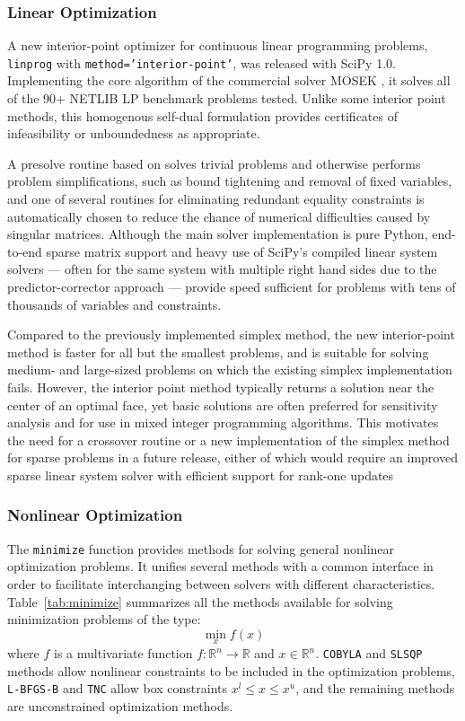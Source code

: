 \subsubsection*{Linear Optimization}

A new interior-point optimizer for continuous linear programming problems, \texttt{linprog} with \texttt{method='interior-point'}, was released with SciPy 1.0. Implementing the core algorithm of the commercial solver MOSEK \cite{andersen2000mosek}, it solves all of the 90+ NETLIB LP benchmark problems \cite{netlib} tested. Unlike some interior point methods, this homogenous self-dual formulation provides certificates of infeasibility or unboundedness as appropriate. 

A presolve routine based on \cite{andersen1995presolving} solves trivial problems and otherwise performs problem simplifications, such as bound tightening and removal of fixed variables, and one of several routines for eliminating redundant equality constraints is automatically chosen to reduce the chance of numerical difficulties caused by singular matrices. Although the main solver implementation is pure Python, end-to-end sparse matrix support and heavy use of SciPy's compiled linear system solvers --- often for the same system with multiple right hand sides due to the predictor-corrector approach --- provide speed sufficient for problems with tens of thousands of variables and constraints.

Compared to the previously implemented simplex method, the new interior-point method is faster for all but the smallest problems, and is suitable for solving medium- and large-sized problems on which the existing simplex implementation fails. However, the interior point method typically returns a solution near the center of an optimal face, yet basic solutions are often preferred for sensitivity analysis and for use in mixed integer programming algorithms. This motivates the need for a crossover routine or a new implementation of the simplex method for sparse problems in a future release, either of which would require an improved sparse linear system solver with efficient support for rank-one updates

\subsubsection*{Nonlinear Optimization}


The \texttt{minimize} function provides methods for solving general nonlinear optimization
problems. It unifies several methods with a common interface in order to facilitate
interchanging between solvers with different characteristics.  Table~\ref{tab:minimize} summarizes
all the methods available for solving minimization problems of the type:
\begin{equation}
  \label{eq:minimization-prob}
  \min_x f(x)
\end{equation}
where $f$ is a multivariate function $f: \mathbb{R}^n \rightarrow \mathbb{R}$ and $x \in \mathbb{R}^n$.
\texttt{COBYLA} and \texttt{SLSQP} methods allow nonlinear constraints to be included in the optimization
problems, \texttt{L-BFGS-B} and \texttt{TNC} allow box constraints $x^l \le x \le x^u$,
and the remaining methods are unconstrained optimization methods.


